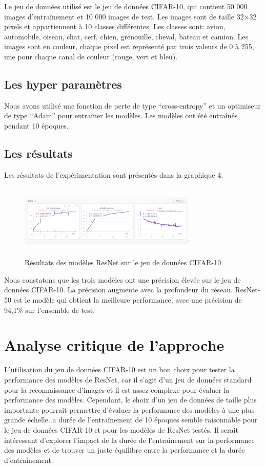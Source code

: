 \documentclass{article}
\begin{document}
Le jeu de données utilisé est le jeu de données CIFAR-10, qui contient 50 000 images d'entraînement et 10 000 images
de test. Les images sont de taille 32$\times$32 pixels et appartiennent à 10 classes différentes. Les classes sont:
avion, automobile, oiseau, chat, cerf, chien, grenouille, cheval, bateau et camion. Les images sont en couleur,
chaque pixel est représenté par trois valeurs de 0 à 255, une pour chaque canal de couleur (rouge, vert et bleu).

\subsection{Les hyper paramètres}

Nous avons utilisé une fonction de perte de type ``cross-entropy'' et un optimiseur de type ``Adam'' pour entraîner les modèles.
Les modèles ont été entraînés pendant 10 époques.

\subsection{Les résultats}

Les résultats de l'expérimentation sont présentés dans la graphique 4.

\begin{figure}[h]
    \centering
    \includegraphics[width=240pt,height=100pt]{./img/result}
    \caption{Résultats des modèles ResNet sur le jeu de données CIFAR-10}\label{fig:result}
\end{figure}

Nous constatons que les trois modèles ont une précision élevée sur le jeu de données CIFAR-10.
La précision augmente avec la profondeur du réseau. ResNet-50 est le modèle qui obtient la meilleure performance,
avec une précision de 94,1\% sur l'ensemble de test.

\section{Analyse critique de l'approche}

L'utilisation du jeu de données CIFAR-10 est un bon choix pour tester la performance des modèles de ResNet,
car il s'agit d'un jeu de données standard pour la reconnaissance d'images et il est assez complexe pour évaluer
la performance des modèles.
Cependant, le choix d'un jeu de données de taille plus importante pourrait permettre d'évaluer la performance
des modèles à une plus grande échelle.
a durée de l'entraînement de 10 époques semble raisonnable pour le jeu de données CIFAR-10 et pour les
modèles de ResNet testés. Il serait intéressant d'explorer l'impact de la durée de l'entraînement sur la
performance des modèles et de trouver un juste équilibre entre la performance et la durée d'entraînement.
\end{document}
